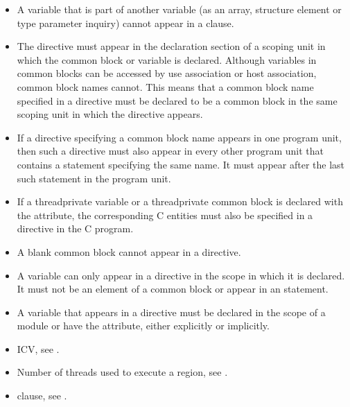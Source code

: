 \begin{fortranspecific}
\begin{itemize} %
\item A variable that is part of another variable (as an array, structure element or type parameter inquiry) cannot
appear in a  clause.

\item The  directive must appear in the declaration section of a scoping
unit in which the common block or variable is declared. Although variables in
common blocks can be accessed by use association or host association, common
block names cannot. This means that a common block name specified in a
 directive must be declared to be a common block in the same
scoping unit in which the  directive appears.

\item If a  directive specifying a common block name appears in one
program unit, then such a directive must also appear in every other program unit that
contains a  statement specifying the same name. It must appear after the last
such  statement in the program unit.

\item If a threadprivate variable or a threadprivate common block is declared
with the  attribute, the corresponding C entities must also be specified in a
 directive in the C program.

\item A blank common block cannot appear in a  directive.

\item A variable can only appear in a  directive in the scope in which it
is declared. It must not be an element of a common block or appear in an
 statement.

\item A variable that appears in a  directive must be declared in the
scope of a module or have the  attribute, either explicitly or implicitly.
\end{itemize} %
\end{fortranspecific}
%
\crossreferences
\begin{itemize}
\item {} ICV, see
.

\item Number of threads used to execute a  region, see
.

\item {} clause, see
.
\end{itemize}



